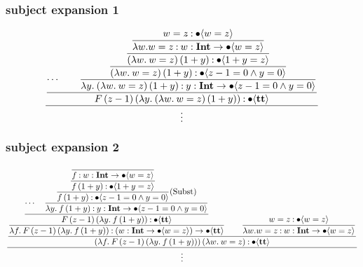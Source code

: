\documentclass{article}
\begin{document}
\subsubsection{subject expansion 1}

\begin{equation*}
    \dfrac{
    \dfrac{
        \cdots
        \qquad
        \dfrac{
            \dfrac{
                \dfrac{
                    \dfrac{
                        w = z \mathbin{:} \bullet \langle  w = z \rangle
                    }{
                        \lambda w. w = z \mathbin{:} {w} : \textbf{Int} \to \bullet \langle w=z \rangle
                    }
                }{
                    (\lambda w.\: w = z)\,(1+y) \mathbin{:} \bullet \langle 1+y=z \rangle
                }
            }{
                (\lambda w.\: w = z)\,(1+y) \mathbin{:} \bullet \langle z-1 = 0 \wedge y = 0 \rangle
            }
        }{
            \lambda y.\: (\lambda w.\: w = z)\,(1+y) \mathbin{:} {y} : \textbf{Int} \to \bullet \langle z-1 = 0 \wedge y = 0 \rangle
        }
    }{
        F\, (z-1) \,(\lambda y.\: (\lambda w.\: w = z)\,(1+y)) \mathbin{:} \bullet \langle \textbf{tt} \rangle
    }
    }{\vdots}
\end{equation*}

\subsubsection{subject expansion 2}

\begin{equation*}
    \dfrac{
    \dfrac{
        \dfrac{
            \dfrac{
                \cdots
                \quad
                \dfrac{
                    \dfrac{
                        \dfrac{
                            \dfrac{}{
                                f \mathbin{:} {w} : \textbf{Int} \to \bullet \langle w=z \rangle
                            }
                        }{
                            f\,(1+y) \mathbin{:} \bullet \langle 1+y=z \rangle
                        }
                    } {
                        f\,(1+y) \mathbin{:} \bullet \langle z - 1 = 0 \wedge y = 0 \rangle
                    }\text{(Subst)}
                } {
                    \lambda y.\: f\,(1+y) \mathbin{:} {y} : \textbf{Int} \to \bullet \langle z - 1 = 0 \wedge y = 0 \rangle
                }
            }{
                F\, (z-1)\, (\lambda y.\: f\,(1+y))  \mathbin{:} \bullet \langle \textbf{tt} \rangle
            }
        }{
            \lambda f.\: F\, (z-1)\, (\lambda y.\: f\,(1+y)) \mathbin{:} ({w} : \textbf{Int} \to \bullet \langle w = z \rangle) \to \bullet \langle \textbf{tt} \rangle
        }
        \qquad 
        \dfrac{
            w = z \mathbin{:} \bullet \langle  w = z \rangle
        }{
            \lambda w. w = z \mathbin{:} {w} : \textbf{Int} \to \bullet \langle w = z \rangle
        }
    }{
        (\lambda f.\: F\, (z-1)\, (\lambda y.\: f\,(1+y)))\, (\lambda w.\: w = z) \mathbin{:} \bullet \langle \textbf{tt} \rangle
    }}{
    \vdots
    }
\end{equation*}
\end{document}
